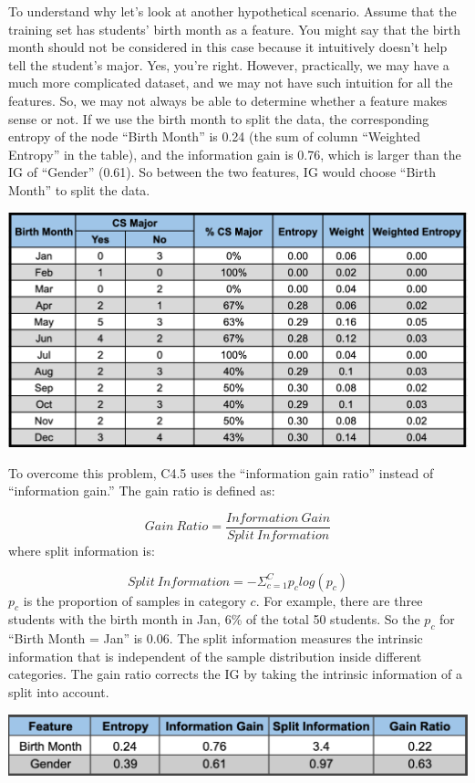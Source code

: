 \documentclass[
  12pt,
]{krantz}
\begin{document}
To understand why let's look at another hypothetical scenario. Assume that the training set has students' birth month as a feature. You might say that the birth month should not be considered in this case because it intuitively doesn't help tell the student's major. Yes, you're right. However, practically, we may have a much more complicated dataset, and we may not have such intuition for all the features. So, we may not always be able to determine whether a feature makes sense or not. If we use the birth month to split the data, the corresponding entropy of the node ``Birth Month'' is 0.24 (the sum of column ``Weighted Entropy'' in the table), and the information gain is 0.76, which is larger than the IG of ``Gender'' (0.61). So between the two features, IG would choose ``Birth Month'' to split the data.

\includegraphics{images/infogainratioexp.png}

To overcome this problem, C4.5 uses the ``information gain ratio'' instead of ``information gain.'' The gain ratio is defined as:

\[Gain\ Ratio = \frac{Information\ Gain}{Split\ Information}\]
where split information is:

\[Split\ Information = -\Sigma_{c = 1}^{C}p_clog(p_c)\]
\(p_c\) is the proportion of samples in category \(c\). For example, there are three students with the birth month in Jan, 6\% of the total 50 students. So the \(p_c\) for ``Birth Month = Jan'' is 0.06. The split information measures the intrinsic information that is independent of the sample distribution inside different categories. The gain ratio corrects the IG by taking the intrinsic information of a split into account.

\includegraphics{images/infogainratioexp2.png}
\end{document}
